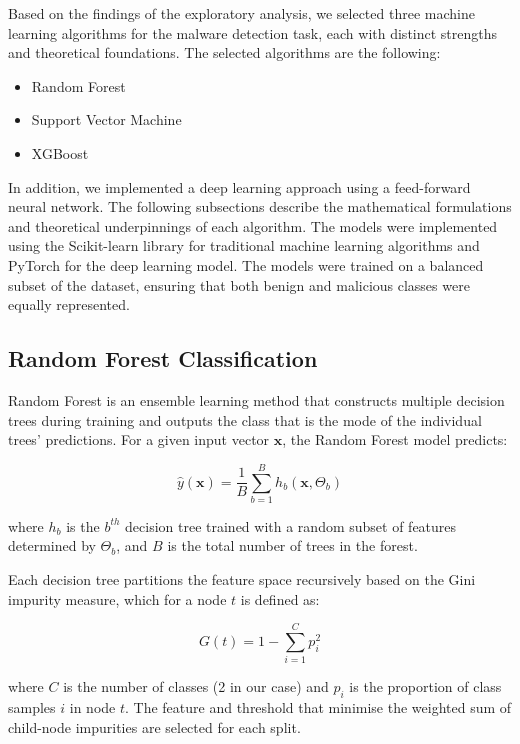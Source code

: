 Based on the findings of the exploratory analysis, we selected three machine learning algorithms for the malware detection task, each with distinct strengths and theoretical foundations. The selected algorithms are the following:

\begin{itemize}
    \item Random Forest
    \item Support Vector Machine
    \item XGBoost
\end{itemize}

In addition, we implemented a deep learning approach using a feed-forward neural network. The following subsections describe the mathematical formulations and theoretical underpinnings of each algorithm. The models were implemented using the Scikit-learn library for traditional machine learning algorithms and PyTorch for the deep learning model. The models were trained on a balanced subset of the dataset, ensuring that both benign and malicious classes were equally represented.

\subsection{Random Forest Classification}

Random Forest is an ensemble learning method that constructs multiple decision trees during training and outputs the class that is the mode of the individual trees' predictions. For a given input vector $\mathbf{x}$, the Random Forest model predicts:

\begin{equation}
\hat{y}(\mathbf{x}) = \frac{1}{B} \sum_{b=1}^{B} h_b(\mathbf{x}, \Theta_b)
\end{equation}

where $h_b$ is the $b^{th}$ decision tree trained with a random subset of features determined by $\Theta_b$, and $B$ is the total number of trees in the forest. 

Each decision tree partitions the feature space recursively based on the Gini impurity measure, which for a node $t$ is defined as:

\begin{equation}
G(t) = 1 - \sum_{i=1}^{C} p_i^2
\end{equation}

where $C$ is the number of classes (2 in our case) and $p_i$ is the proportion of class samples $i$ in node $t$. The feature and threshold that minimise the weighted sum of child-node impurities are selected for each split.

